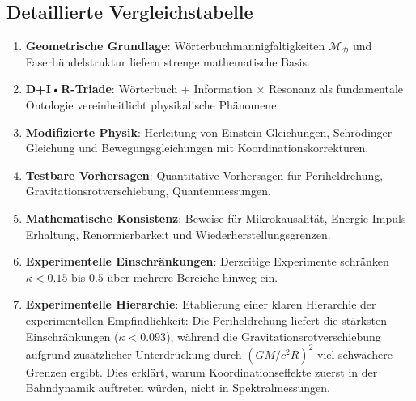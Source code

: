 \documentclass[11pt,a4paper]{article}
\begin{document}
	\subsection{Detaillierte Vergleichstabelle}
	\begin{enumerate}
		\item \textbf{Geometrische Grundlage}: Wörterbuchmannigfaltigkeiten $\mathcal{M}_{\mathcal{D}}$ und Faserbündelstruktur liefern strenge mathematische Basis.
		
		\item \textbf{D+I•R-Triade}: Wörterbuch + Information × Resonanz als fundamentale Ontologie vereinheitlicht physikalische Phänomene.
		
		\item \textbf{Modifizierte Physik}: Herleitung von Einstein-Gleichungen, Schrödinger-Gleichung und Bewegungsgleichungen mit Koordinationskorrekturen.
		
		\item \textbf{Testbare Vorhersagen}: Quantitative Vorhersagen für Periheldrehung, Gravitationsrotverschiebung, Quantenmessungen.
		
		\item \textbf{Mathematische Konsistenz}: Beweise für Mikrokausalität, Energie-Impuls-Erhaltung, Renormierbarkeit und Wiederherstellungsgrenzen.
		
		\item \textbf{Experimentelle Einschränkungen}: Derzeitige Experimente schränken $\kappa < 0.15$ bis $0.5$ über mehrere Bereiche hinweg ein.
		
		\item \textbf{Experimentelle Hierarchie}: Etablierung einer klaren Hierarchie der experimentellen Empfindlichkeit: Die Periheldrehung liefert die stärksten Einschränkungen ($\kappa < 0.093$), während die Gravitationsrotverschiebung aufgrund zusätzlicher Unterdrückung durch $(GM/c^2R)^2$ viel schwächere Grenzen ergibt. Dies erklärt, warum Koordinationseffekte zuerst in der Bahndynamik auftreten würden, nicht in Spektralmessungen.
	\end{enumerate}
\end{document}
